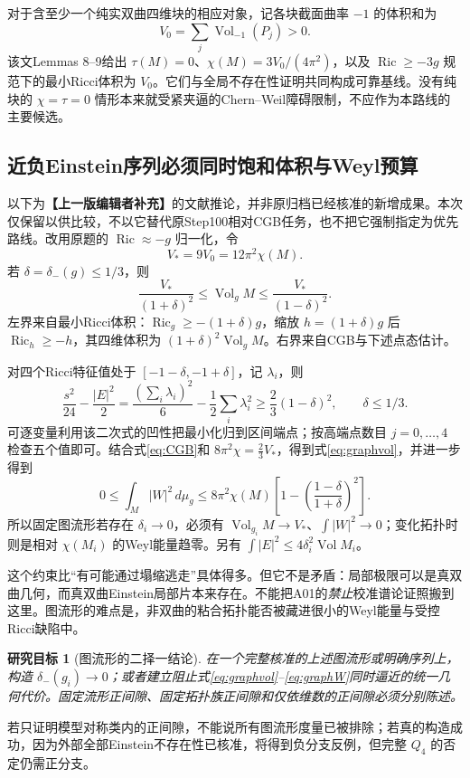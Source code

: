 \documentclass[UTF8,a4paper,11pt,fontset=fandol]{ctexart}
\numberwithin{equation}{section}
\newtheorem{target}[theorem]{研究目标}
\theoremstyle{definition}
\newcommand{\Ric}{\operatorname{Ric}}
\newcommand{\Vol}{\operatorname{Vol}}
\newcommand{\dd}{\,d\mu_g}
\newcommand{\status}[1]{\textbf{【#1】}}
\begin{document}
对于含至少一个纯实双曲四维块的相应对象，记各块截面曲率 $-1$ 的体积和为
\[
V_0=\sum_j\Vol_{-1}(P_j)>0.
\]
该文Lemmas 8--9给出 $\tau(M)=0$、$\chi(M)=3V_0/(4\pi^2)$，以及 $\Ric\ge-3g$ 规范下的最小Ricci体积为 $V_0$。它们与全局不存在性证明共同构成可靠基线。没有纯块的 $\chi=\tau=0$ 情形本来就受紧夹逼的Chern--Weil障碍限制，不应作为本路线的主要候选。

\subsection{近负Einstein序列必须同时饱和体积与Weyl预算}
以下为\status{上一版编辑者补充}的文献推论，并非原归档已经核准的新增成果。本次仅保留以供比较，不以它替代原Step100相对CGB任务，也不把它强制指定为优先路线。改用原题的 $\Ric\approx-g$ 归一化，令
\[
V_*=9V_0=12\pi^2\chi(M).
\]
若 $\delta=\delta_-(g)\le1/3$，则
\begin{equation}\label{eq:graphvol}
\boxed{\frac{V_*}{(1+\delta)^2}\le\Vol_gM
\le\frac{V_*}{(1-\delta)^2}.}
\end{equation}
左界来自最小Ricci体积：$\Ric_g\ge-(1+\delta)g$，缩放 $h=(1+\delta)g$ 后 $\Ric_h\ge-h$，其四维体积为 $(1+\delta)^2\Vol_gM$。右界来自CGB与下述点态估计。

对四个Ricci特征值处于 $[-1-\delta,-1+\delta]$，记 $\lambda_i$，则
\[
\frac{s^2}{24}-\frac{|E|^2}{2}
=\frac{(\sum_i\lambda_i)^2}{6}-\frac12\sum_i\lambda_i^2
\ge\frac23(1-\delta)^2,\qquad\delta\le1/3.
\]
可逐变量利用该二次式的凹性把最小化归到区间端点；按高端点数目 $j=0,\dots,4$ 检查五个值即可。结合式\eqref{eq:CGB}和 $8\pi^2\chi=\frac23V_*$，得到式\eqref{eq:graphvol}，并进一步得到
\begin{equation}\label{eq:graphW}
\boxed{0\le\int_M|W|^2\dd\le8\pi^2\chi(M)
\left[1-\left(\frac{1-\delta}{1+\delta}\right)^2\right].}
\end{equation}
所以固定图流形若存在 $\delta_i\to0$，必须有 $\Vol_{g_i}M\to V_*$、$\int|W|^2\to0$；变化拓扑时则是相对 $\chi(M_i)$ 的Weyl能量趋零。另有 $\int|E|^2\le4\delta_i^2\Vol M_i$。

这个约束比“有可能通过塌缩逃走”具体得多。但它不是矛盾：局部极限可以是真双曲几何，而真双曲Einstein局部片本来存在。不能把A01的\emph{禁止}校准谱论证照搬到这里。图流形的难点是，非双曲的粘合拓扑能否被藏进很小的Weyl能量与受控Ricci缺陷中。

\begin{target}[图流形的二择一结论]
在一个完整核准的上述图流形或明确序列上，构造 $\delta_-(g_i)\to0$；或者建立阻止式\eqref{eq:graphvol}--\eqref{eq:graphW}同时逼近的统一几何代价。固定流形正间隙、固定拓扑族正间隙和仅依维数的正间隙必须分别陈述。
\end{target}
若只证明模型对称类内的正间隙，不能说所有图流形度量已被排除；若真的构造成功，因为外部全部Einstein不存在性已核准，将得到负分支反例，但完整 $Q_4$ 的否定仍需正分支。
\end{document}
